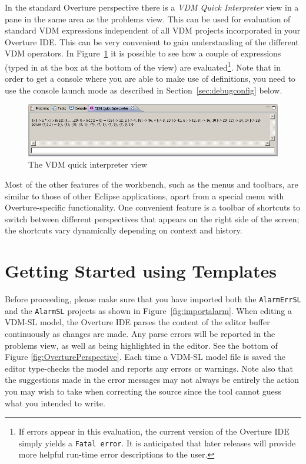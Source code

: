 In the standard Overture perspective there is a \emph{VDM Quick Interpreter} view in a pane in the same area as the problems view. This can be used for evaluation of standard VDM expressions independent of all VDM projects incorporated in your Overture IDE. This can be very convenient to gain understanding of the
different VDM operators. In Figure~\ref{fig:QuickIntView} it is possible to see how a couple of expressions (typed in at the box at the bottom of the view) are evaluated\footnote{If errors appear in this evaluation, the current version of the Overture IDE simply yields a \texttt{Fatal error}.  It is anticipated that later releases will provide more helpful run-time error descriptions to the user.}. Note that
in order to get a console where you are able to make use of definitions, you need to use the console launch mode as described in Section~\ref{sec:debugconfig} below. 
%
\begin{figure}[!htb]
\begin{center}
  \includegraphics[width=4.5in]{figures/quickinterpreter}
  \caption[labelInTOC]{The VDM quick interpreter view}
  \label{fig:QuickIntView}
\end{center}
\end{figure}
%
Most of the other features of the workbench, such as the menus and toolbars, are similar to those of other Eclipse applications, apart from a special menu with Overture-specific functionality. One convenient feature is a toolbar of shortcuts to switch between different perspectives that appears on the right side of the screen; the shortcuts vary dynamically depending on context and history.
%
\section{Getting Started using Templates}\label{sec:templates}
Before proceeding, please make sure that you have imported both the \texttt{AlarmErrSL} and the \texttt{AlarmSL} projects as shown in Figure~\ref{fig:importalarm}. 
When editing a VDM-SL model, the Overture IDE parses the content of the editor buffer continuously as changes are made. Any parse errors will be reported in the problems view, as well as being highlighted in the editor. See the bottom of Figure \ref{fig:OverturePerspective}. Each time a VDM-SL model file is
saved the editor type-checks the model and reports any errors or warnings. Note also that the suggestions made in the error messages may not always be entirely the action you may wish to take when
correcting the source since the tool cannot guess what you intended to write.

